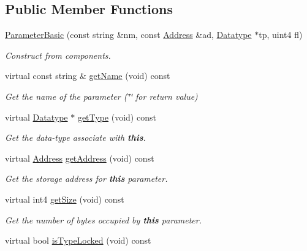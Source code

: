 \subsection*{Public Member Functions}
\begin{DoxyCompactItemize}
\item 
\mbox{\hyperlink{class_parameter_basic_a2b84d49e6b4eca382a863567de942193}{Parameter\+Basic}} (const string \&nm, const \mbox{\hyperlink{class_address}{Address}} \&ad, \mbox{\hyperlink{class_datatype}{Datatype}} $\ast$tp, uint4 fl)
\begin{DoxyCompactList}\small\item\em Construct from components. \end{DoxyCompactList}\item 
virtual const string \& \mbox{\hyperlink{class_parameter_basic_aa8bfb0e008ccc1953627e5415e64fadb}{get\+Name}} (void) const
\begin{DoxyCompactList}\small\item\em Get the name of the parameter (\char`\"{}\char`\"{} for return value) \end{DoxyCompactList}\item 
virtual \mbox{\hyperlink{class_datatype}{Datatype}} $\ast$ \mbox{\hyperlink{class_parameter_basic_a0120ba1a51396ed32a1ff0638f795146}{get\+Type}} (void) const
\begin{DoxyCompactList}\small\item\em Get the data-\/type associate with {\bfseries{this}}. \end{DoxyCompactList}\item 
virtual \mbox{\hyperlink{class_address}{Address}} \mbox{\hyperlink{class_parameter_basic_a0d007e8a1720e88d34aa139d62000c1a}{get\+Address}} (void) const
\begin{DoxyCompactList}\small\item\em Get the storage address for {\bfseries{this}} parameter. \end{DoxyCompactList}\item 
virtual int4 \mbox{\hyperlink{class_parameter_basic_a96b3cef1901c8f4b7591551ea7b4d407}{get\+Size}} (void) const
\begin{DoxyCompactList}\small\item\em Get the number of bytes occupied by {\bfseries{this}} parameter. \end{DoxyCompactList}\item 
virtual bool \mbox{\hyperlink{class_parameter_basic_a837bdcd23e9bdfad0b8ba0b6b78b9752}{is\+Type\+Locked}} (void) const

\end{DoxyCompactItemize}
